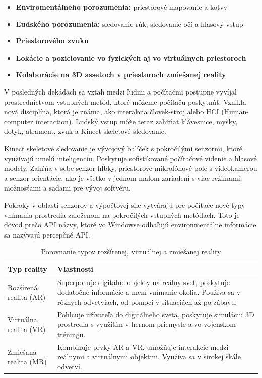 \begin{itemize}
    \item \textbf{Enviromentálneho porozumenia:} priestorové mapovanie a kotvy
    \item \textbf{Ľudského porozumenia:} sledovanie rúk, sledovanie očí a hlasový vstup
    \item \textbf{Priestorového zvuku}
    \item \textbf{Lokácie a poziciovanie vo fyzických aj vo virtuálnych priestoroch}
    \item \textbf{Kolaborácie na 3D assetoch v priestoroch zmiešanej reality}
\end{itemize}

V posledných dekádach sa vzťah medzi ľudmi a počítačmi postupne vyvíjal prostredníctvom vstupných metód, ktoré môžeme počítaču poskytnúť. Vznikla nová disciplína, ktorá je známa, ako interakcia človek-stroj alebo HCI (Human-computer interaction). Ľudský vstup môže teraz zahŕňať klávesnice, myšky, dotyk, atrament, zvuk a Kinect skeletové sledovanie. 

Kinect skeletové sledovanie je vývojový balíček s pokročilými senzormi, ktoré využívajú umelú inteligenciu. Poskytuje sofistikované počítačové videnie a hlasové modely. Zahŕňa v sebe senzor hĺbky, priestorové mikrofónové pole s videokamerou a senzor orientácie, ako je všetko v jednom malom zariadení s viac režimami, možnosťami a sadami pre vývoj softvéru. 

Pokroky v oblasti senzorov a výpočtovej sile vytvárajú pre počítače nové typy vnímania prostredia založenom na pokročilých vstupných metódach. Toto je dôvod prečo API názvy, ktoré vo Windowse odhaľujú environmentálne informácie sa nazývajú percepčné API. \cite{microsoft2023mixedreality}

\begin{table}[h]
\centering
\begin{tabular}{|l|p{7cm}|}
\hline
\textbf{Typ reality}       & \textbf{Vlastnosti}                                                                                                                                                                                                                             \\ \hline
Rozšírená realita (AR)     & Superponuje digitálne objekty na reálny svet, poskytuje dodatočné informácie a mení vnímanie okolia. Používa sa v rôznych odvetviach, od pomoci v situáciách až po zábavu. \\ \hline
Virtuálna realita (VR)     & Pohlcuje užívateľa do digitálneho sveta, poskytuje simuláciu 3D prostredia s využitím v hernom priemysle a vo vojenskom tréningu.           \\ \hline
Zmiešaná realita (MR)      & Kombinuje prvky AR a VR, umožňuje interakcie medzi reálnymi a virtuálnymi objektmi. Využíva sa v širokej škále odvetví.           \\ \hline
\end{tabular}
\caption{Porovnanie typov rozšírenej, virtuálnej a zmiešanej reality}
\label{tab:porovnanie_realit}
\end{table}

